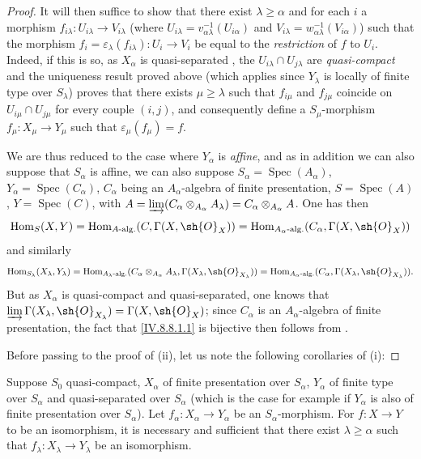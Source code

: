 \begin{proof}
It will then suffice to show that there exist $\lambda\geqslant\alpha$ and for each $i$ a morphism $f_{i\lambda}:U_{i\lambda}\to V_{i\lambda}$ (where $U_{i\lambda}=v_{\alpha\lambda}^{-1}(U_{i\alpha})$ and $V_{i\lambda}=w_{\alpha\lambda}^{-1}(V_{i\alpha})$) such that the morphism $f_i=\varepsilon_\lambda(f_{i\lambda}):U_i\to V_i$ be equal to the \emph{restriction} of $f$ to $U_i$.
Indeed, if this is so, as $X_\alpha$ is quasi-separated , the $U_{i\lambda}\cap U_{j\lambda}$ are \emph{quasi-compact} and the uniqueness result proved above (which applies since $Y_\lambda$ is locally of finite type over $S_\lambda$) proves that there exists $\mu\geqslant\lambda$ such that $f_{i\mu}$ and $f_{j\mu}$ coincide on $U_{i\mu}\cap U_{j\mu}$ for every couple $(i,j)$, and consequently define a $S_\mu$-morphism $f_\mu:X_\mu\to Y_\mu$ such that $\varepsilon_\mu(f_\mu)=f$.

We are thus reduced to the case where $Y_\alpha$ is \emph{affine}, and as in addition we can also suppose that $S_\alpha$ is affine, we can also suppose $S_\alpha=\operatorname{Spec}(A_\alpha)$, $Y_\alpha=\operatorname{Spec}(C_\alpha)$, $C_\alpha$ being an $A_\alpha$-algebra of finite presentation, $S=\operatorname{Spec}(A)$, $Y=\operatorname{Spec}(C)$, with $A=\varinjlim(C_\alpha\otimes_{A_\alpha}A_\lambda)=C_\alpha\otimes_{A_\alpha}A$.
One has then
\[
  \operatorname{Hom}_S(X,Y)=\operatorname{Hom}_{A\text{-alg.}}(C,\Gamma(X,\sh{O}_X))=\operatorname{Hom}_{A_\alpha\text{-alg.}}(C_\alpha,\Gamma(X,\sh{O}_X))
\]
 and similarly
\[
  \operatorname{Hom}_{S_\lambda}(X_\lambda,Y_\lambda)=\operatorname{Hom}_{A_\lambda\text{-alg.}}(C_\alpha\otimes_{A_\alpha}A_\lambda,\Gamma(X_\lambda,\sh{O}_{X_\lambda}))=\operatorname{Hom}_{A_\alpha\text{-alg.}}(C_\alpha,\Gamma(X_\lambda,\sh{O}_{X_\lambda})).
\]
But as $X_\alpha$ is quasi-compact and quasi-separated, one knows  that $\varinjlim\Gamma(X_\lambda,\sh{O}_{X_\lambda})=\Gamma(X,\sh{O}_X)$; since $C_\alpha$ is an $A_\alpha$-algebra of finite presentation, the fact that \eqref{IV.8.8.1.1} is bijective then follows from .

Before passing to the proof of (ii), let us note the following corollaries of (i):
\end{proof}

\begin{corollary}[8.8.4]
\label{IV.8.8.4}
Suppose $S_0$ quasi-compact, $X_\alpha$ of finite presentation over $S_\alpha$, $Y_\alpha$ of finite type over $S_\alpha$ and quasi-separated over $S_\alpha$ (which is the case for example if $Y_\alpha$ is also
of finite presentation over $S_\alpha$).
Let $f_\alpha:X_\alpha\to Y_\alpha$ be an $S_\alpha$-morphism.
For $f:X\to Y$ to be an isomorphism, it is necessary and sufficient that there exist $\lambda\geqslant\alpha$ such that $f_\lambda:X_\lambda\to Y_\lambda$ be an isomorphism.
\end{corollary}

